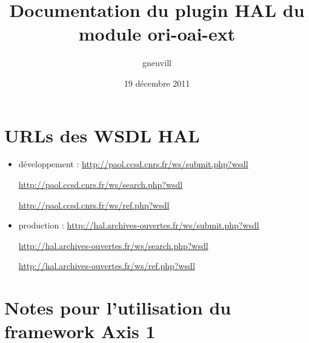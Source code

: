 \documentclass[11pt]{article}
\title{Documentation du plugin HAL du module ori-oai-ext}
\author{gneuvill}
\date{19 décembre 2011}
\begin{document}
\maketitle

\setcounter{tocdepth}{3}
\tableofcontents
\vspace*{1cm}

\section{URLs des WSDL HAL}
\label{sec-1}


\begin{itemize}
\item développement :
    \href{http://paol.ccsd.cnrs.fr/ws/submit.php?wsdl}{http://paol.ccsd.cnrs.fr/ws/submit.php?wsdl}

    \href{http://paol.ccsd.cnrs.fr/ws/search.php?wsdl}{http://paol.ccsd.cnrs.fr/ws/search.php?wsdl}

    \href{http://paol.ccsd.cnrs.fr/ws/ref.php?wsdl}{http://paol.ccsd.cnrs.fr/ws/ref.php?wsdl}
\item production :
    \href{http://hal.archives-ouvertes.fr/ws/submit.php?wsdl}{http://hal.archives-ouvertes.fr/ws/submit.php?wsdl}

    \href{http://hal.archives-ouvertes.fr/ws/search.php?wsdl}{http://hal.archives-ouvertes.fr/ws/search.php?wsdl}

    \href{http://hal.archives-ouvertes.fr/ws/ref.php?wsdl}{http://hal.archives-ouvertes.fr/ws/ref.php?wsdl}
\end{itemize}
\section{Notes pour l'utilisation du framework \textbf{Axis 1}}
\label{sec-2}
\end{document}
